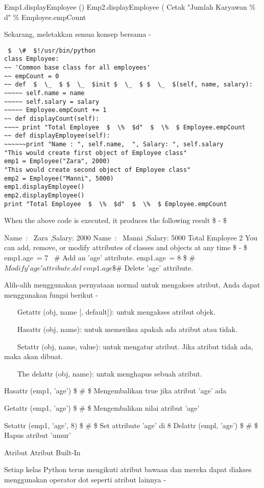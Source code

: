 Emp1.displayEmployee ()
Emp2.displayEmployee (
Cetak "Jumlah Karyawan $  \%  $ d" $  \%  $ Employee.empCount

Sekarang, meletakkan semua konsep bersama -
\begin{verbatim}
 $  \#  $!/usr/bin/python
class Employee:
~~ 'Common base class for all employees'
~~ empCount = 0
~~ def  $  \_  $ $  \_  $init $  \_  $ $  \_  $(self, name, salary):
~~~~~ self.name = name
~~~~~ self.salary = salary
~~~~~ Employee.empCount += 1
~~ def displayCount(self):
~~~~ print "Total Employee  $  \%  $d"  $  \%  $ Employee.empCount
~~ def displayEmployee(self):
~~~~~~print "Name : ", self.name,  ", Salary: ", self.salary
"This would create first object of Employee class"
emp1 = Employee("Zara", 2000)
"This would create second object of Employee class"
emp2 = Employee("Manni", 5000)
emp1.displayEmployee()
emp2.displayEmployee()
print "Total Employee  $  \%  $d"  $  \%  $ Employee.empCount
\end{verbatim}
When the above code is executed, it produces the following result  \$ - \$

Name~:~ Zara ,Salary:  2000
Name~:~ Manni ,Salary:  5000
Total Employee 2
You can add, remove, or modify attributes of classes and objects at any time  \$ - \$
emp1.age~= 7  \ $  \#  $ Add an 'age' attribute.
emp1.age~= 8   \$  \#  $ Modify 'age' attribute.
del~emp1.age  \$  \#  $ Delete 'age' attribute.

Alih-alih menggunakan pernyataan normal untuk mengakses atribut, Anda dapat menggunakan fungsi berikut -

~~~ Getattr (obj, name [, default]): untuk mengakses atribut objek.

~~~ Hasattr (obj, name): untuk memeriksa apakah ada atribut atau tidak.


~~~ Setattr (obj, name, value): untuk mengatur atribut. Jika atribut tidak ada, maka akan dibuat.


~~~ The delattr (obj, name): untuk menghapus sebuah atribut.


Hasattr (emp1, 'age')  \$  \#  \$ Mengembalikan true jika atribut 'age' ada

Getattr (emp1, 'age')  \$  \#  \$ Mengembalikan nilai atribut 'age'

Setattr (emp1, 'age', 8)  \$  \#  \$ Set attribute 'age' di 8
\noindent
Delattr (empl, 'age')  \$  \#  \$ Hapus atribut 'umur'


Atribut Atribut Built-In

Setiap kelas Python terus mengikuti atribut bawaan dan mereka dapat diakses menggunakan operator dot seperti atribut lainnya -

